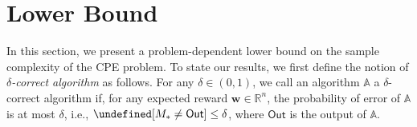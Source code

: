 \documentclass{article}
\newcommand{\Problem}{{CPE}\xspace}
\newcommand{\M}{\mathcal M}
\newcommand{\B}{\mathcal B}
\newcommand{\RR}{\mathbb R}
\newcommand{\out}{\mathsf{Out}}
\let\Pr\undefined
\DeclareMathOperator{\Pr}{Pr}
\renewcommand{\vec}[1]{\boldsymbol{#1}}
\begin{document}




\vspace{-0.7em}
\section{Lower Bound}
\vspace{-0.7em}
In this section, we present a problem-dependent lower bound on the sample complexity of the \Problem problem. 
To state our results, we first define the notion of \emph{$\delta$-correct algorithm} as follows.
For any $\delta \in (0,1)$, we call an algorithm $\mathbb A$ a $\delta$-correct algorithm if, for any expected reward $\vec w \in \RR^{n}$, the probability of error of $\mathbb A$ is at most $\delta$, i.e., $\Pr[M_*\not =\out] \le \delta$, where $\out$ is the output of $\mathbb A$.
\end{document}
